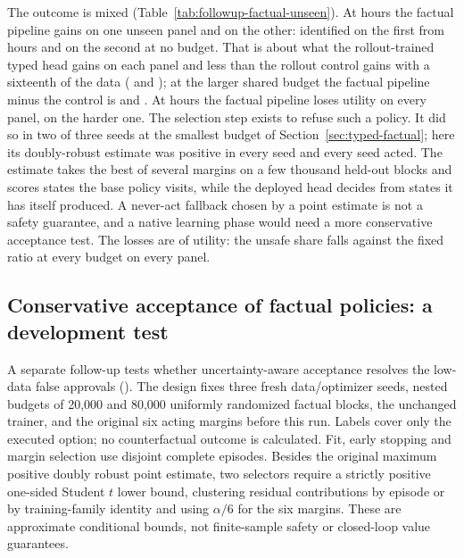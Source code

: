 \documentclass[10pt]{article}
\begin{document}
The outcome is mixed (Table~\ref{tab:followup-factual-unseen}). At \TypedUnseenThreeHours{} hours the factual pipeline gains \TypedUnseenThreePanelBGain{} \TypedUnseenThreePanelBGainT{} on one unseen panel and \TypedUnseenThreePanelAGain{} \TypedUnseenThreePanelAGainT{} on the other: identified on the first from \TypedUnseenTwoHours{} hours and on the second at no budget. That is about what the rollout-trained typed head gains on each panel and less than the rollout control gains with a sixteenth of the data (\TypedUnseenOnePanelBControlGain{} and \TypedUnseenOnePanelAControlGain{}); at the larger shared budget the factual pipeline minus the control is \TypedUnseenTwoPanelBPrice{} \TypedUnseenTwoPanelBPriceT{} and \TypedUnseenTwoPanelAPrice{} \TypedUnseenTwoPanelAPriceT{}. At \TypedUnseenOneHours{} hours the factual pipeline loses utility on every panel, \TypedUnseenOnePanelAGain{} \TypedUnseenOnePanelAGainT{} on the harder one. The selection step exists to refuse such a policy. It did so in two of three seeds at the smallest budget of Section~\ref{sec:typed-factual}; here its doubly-robust estimate was positive in every seed and every seed acted. The estimate takes the best of several margins on a few thousand held-out blocks and scores states the base policy visits, while the deployed head decides from states it has itself produced. A never-act fallback chosen by a point estimate is not a safety guarantee, and a native learning phase would need a more conservative acceptance test. The losses are of utility: the unsafe share falls against the fixed ratio at every budget on every panel.

\subsection{Conservative acceptance of factual policies: a development test}
\label{sec:factual-acceptance}
A separate follow-up tests whether uncertainty-aware acceptance resolves the low-data false approvals (). The design fixes three fresh data/optimizer seeds, nested budgets of 20,000 and 80,000 uniformly randomized factual blocks, the unchanged trainer, and the original six acting margins before this run. Labels cover only the executed option; no counterfactual outcome is calculated. Fit, early stopping and margin selection use disjoint complete episodes. Besides the original maximum positive doubly robust point estimate, two selectors require a strictly positive one-sided Student $t$ lower bound, clustering residual contributions by episode or by training-family identity and using $\alpha/6$ for the six margins. These are approximate conditional bounds, not finite-sample safety or closed-loop value guarantees.
\end{document}
